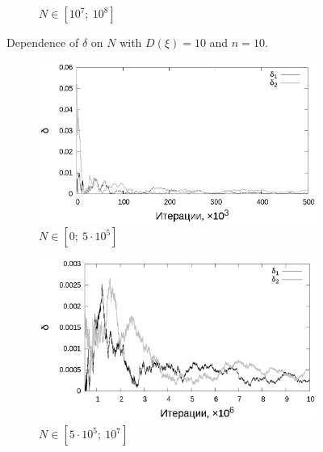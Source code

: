\documentclass[11pt,a4paper]{article}
\theoremstyle{definition}
\begin{document}
\begin{figure}[h!]
\begin{subfigure}[b]{0.3\textwidth}
    \caption{$N \in [10^7;~10^8]$}
    \label{fig:classic_var10_n10_end}
  \end{subfigure}
  \caption{Dependence of $\delta$ on $N$ with $D(\xi) = 10$ and $n = 10$.}
  \label{fig:classic_var10_n10}
\end{figure}

\begin{figure}[h!]
  \begin{subfigure}[b]{0.3\textwidth}
    \includegraphics[width=\textwidth]{figs/classic/linear_log_1x_2_samples_10_variance_1_norm.log_0_500.eps}
    \caption{$N \in [0;~5 \cdot 10^5]$}
    \label{fig:classic_var1_n10_begin}
  \end{subfigure}
  \begin{subfigure}[b]{0.3\textwidth}
    \includegraphics[width=\textwidth]{figs/classic/linear_log_1x_2_samples_10_variance_1_norm.log_500_10000.eps}
    \caption{$N \in [5 \cdot 10^5;~10^7]$}
    \label{fig:classic_var1_n10_middle}
  \end{subfigure}
  \begin{subfigure}[b]{0.3\textwidth}

\end{subfigure}
\end{figure}
\end{document}
